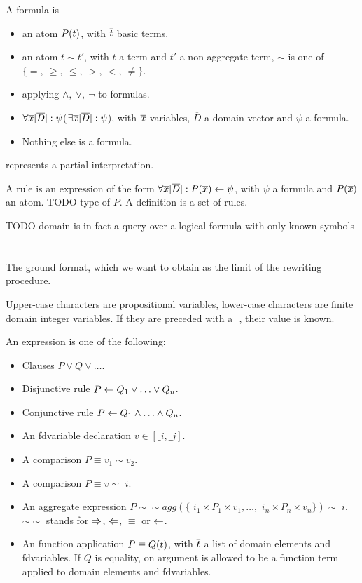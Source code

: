 \documentclass{article}
\newcommand{\DDD}{\ensuremath{\overline{D}}}
\begin{document}
A formula is 
\begin{itemize}
  \item an atom $P(\overline{t})$, with $\overline{t}$ basic terms.
  \item an atom $t \sim t'$, with $t$ a term and $t'$ a non-aggregate term, $\sim$ is one of $\{=,~\geq,~\leq,~>,~<,~\neq\}$.
  \item applying $\land,~\lor,~\lnot$ to formulas.
  \item $\forall \xxx[\DDD]: \psi$($\exists \xxx[\DDD]: \psi$), with $\overline{x}$ variables, $\DDD$ a domain vector and $\psi$ a formula.
  \item Nothing else is a formula. 
\end{itemize}

\inter represents a partial interpretation.

A rule is an expression of the form $\forall \xxx[\DDD]: P(\xxx) \lrule \psi$, with $\psi$ a formula and $P(\overline{x})$ an atom. 
TODO type of $P$.
A definition is a set of rules.

TODO domain is in fact a query over a logical formula with only known symbols


\section{\pcdot}
The ground format, which we want to obtain as the limit of the rewriting procedure.

Upper-case characters are propositional variables, lower-case characters are finite domain integer variables.
If they are preceded with a $\_$, their value is known.

An expression is one of the following:
\begin{itemize}
  \item Clauses $P \lor Q \lor \ldots$.
  \item Disjunctive rule $P \leftarrow Q_1 \lor \ldots \lor Q_n$.
  \item Conjunctive rule $P \leftarrow Q_1 \land \ldots \land Q_n$.
  \item An fdvariable declaration $v \in [\_i, \_j]$.
  \item A comparison $P \equiv v_1 \sim v_2$.
  \item A comparison $P \equiv v \sim \_i$.
  \item An aggregate expression $P \sim\sim agg(\{\_i_1 \times P_1 \times v_1,\ldots,\_i_n \times P_n \times v_n\}) \sim \_i$. $\sim\sim$ stands for $\Rightarrow$, $\Leftarrow$, $\equiv$ or $\leftarrow$.
  \item An function application $P \equiv Q(\overline{t})$, with $\overline{t}$ a list of domain elements and fdvariables. If $Q$ is equality, on argument is allowed to be a function term applied to domain elements and fdvariables.
\end{itemize}
\end{document}
